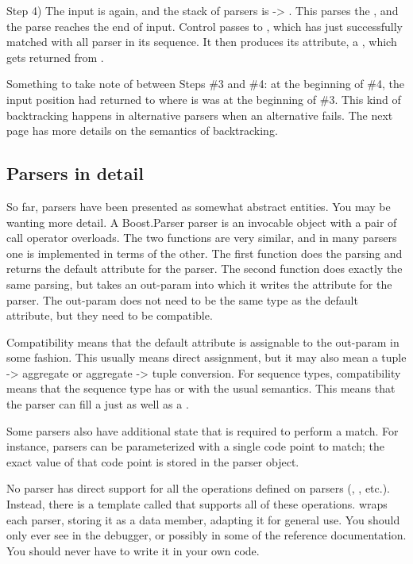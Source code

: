 \documentclass{MyBook}
\begin{document}
Step 4) The input is  again, and the stack of parsers is  -> . This parses the , and the parse reaches the end of input. Control passes to , which has just successfully matched with all parser in its sequence. It then produces its attribute, a , which gets returned from .

Something to take note of between Steps \#3 and \#4: at the beginning of \#4, the input position had returned to where is was at the beginning of \#3. This kind of backtracking happens in alternative parsers when an alternative fails. The next page has more details on the semantics of backtracking.

\subsection{Parsers in detail}

So far, parsers have been presented as somewhat abstract entities. You may be wanting more detail. A Boost.Parser parser  is an invocable object with a pair of call operator overloads. The two functions are very similar, and in many parsers one is implemented in terms of the other. The first function does the parsing and returns the default attribute for the parser. The second function does exactly the same parsing, but takes an out-param into which it writes the attribute for the parser. The out-param does not need to be the same type as the default attribute, but they need to be compatible.

Compatibility means that the default attribute is assignable to the out-param in some fashion. This usually means direct assignment, but it may also mean a tuple -> aggregate or aggregate -> tuple conversion. For sequence types, compatibility means that the sequence type has  or  with the usual semantics. This means that the parser  can fill a  just as well as a .

Some parsers also have additional state that is required to perform a match. For instance,  parsers can be parameterized with a single code point to match; the exact value of that code point is stored in the parser object.

No parser has direct support for all the operations defined on parsers (, , etc.). Instead, there is a template called  that supports all of these operations.  wraps each parser, storing it as a data member, adapting it for general use. You should only ever see  in the debugger, or possibly in some of the reference documentation. You should never have to write it in your own code.
\end{document}
